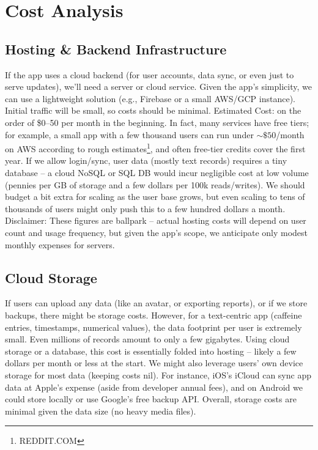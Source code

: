 \documentclass{article}
\begin{document}
\section{Cost Analysis}
\subsection{Hosting \& Backend Infrastructure}
If the app uses a cloud backend (for user accounts, data sync, or even just to serve updates), we’ll need a server or cloud service. Given the app’s simplicity, we can use a lightweight solution (e.g., Firebase or a small AWS/GCP instance). Initial traffic will be small, so costs should be minimal. Estimated Cost: on the order of \$0–50 per month in the beginning. In fact, many services have free tiers; for example, a small app with a few thousand users can run under \(\sim\$50\)/month on AWS according to rough estimates\footnote{REDDIT.COM}, and often free-tier credits cover the first year. If we allow login/sync, user data (mostly text records) requires a tiny database – a cloud NoSQL or SQL DB would incur negligible cost at low volume (pennies per GB of storage and a few dollars per 100k reads/writes). We should budget a bit extra for scaling as the user base grows, but even scaling to tens of thousands of users might only push this to a few hundred dollars a month. Disclaimer: These figures are ballpark – actual hosting costs will depend on user count and usage frequency, but given the app’s scope, we anticipate only modest monthly expenses for servers.

\subsection{Cloud Storage}
If users can upload any data (like an avatar, or exporting reports), or if we store backups, there might be storage costs. However, for a text-centric app (caffeine entries, timestamps, numerical values), the data footprint per user is extremely small. Even millions of records amount to only a few gigabytes. Using cloud storage or a database, this cost is essentially folded into hosting – likely a few dollars per month or less at the start. We might also leverage users’ own device storage for most data (keeping costs nil). For instance, iOS’s iCloud can sync app data at Apple’s expense (aside from developer annual fees), and on Android we could store locally or use Google’s free backup API. Overall, storage costs are minimal given the data size (no heavy media files).
\end{document}
